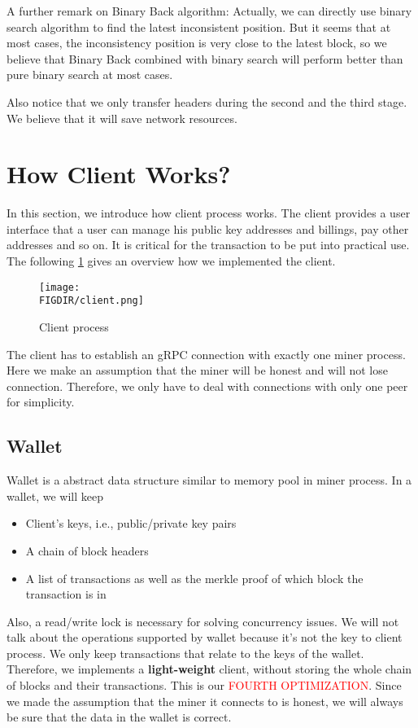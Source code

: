\documentclass{article}
\begin{document}
\begin{spacing}{1.1}
A further remark on Binary Back algorithm: Actually, we can directly use binary search algorithm to find the latest inconsistent position. But it seems that at most cases, the inconsistency position is very close to the latest block, so we believe that Binary Back combined with binary search will perform better than pure binary search at most cases. 

Also notice that we only transfer headers during the second and the third stage. We believe that it will save network resources.

\section{How Client Works?}

In this section, we introduce how client process works. The client provides a user interface that a user can manage his public key addresses and billings, pay other addresses and so on. It is critical for the transaction to be put into practical use. The following \cref{fig:client} gives an overview how we implemented the client.

\begin{figure}[htbp]
    \centering
    \texttt{[image: \\FIGDIR/client.png]}
    \caption{Client process}
    \label{fig:client}
\end{figure}

The client has to establish an gRPC connection with exactly one miner process. Here we make an assumption that the miner will be honest and will not lose connection. Therefore, we only have to deal with connections with only one peer for simplicity.

\subsection{Wallet}

Wallet is a abstract data structure similar to memory pool in miner process. In a wallet, we will keep 
\begin{itemize}
    \setlength\itemsep{1pt}
    \item Client's keys, i.e., public/private key pairs
    \item A chain of block headers
    \item A list of transactions as well as the merkle proof of which block the transaction is in
\end{itemize}

Also, a read/write lock is necessary for solving concurrency issues. We will not talk about the operations supported by wallet because it's not the key to client process. We only keep transactions that relate to the keys of the wallet. Therefore, we implements a \textbf{light-weight} client, without storing the whole chain of blocks and their transactions. This is our \textcolor{red}{FOURTH OPTIMIZATION}. Since we made the assumption that the miner it connects to is honest, we will always be sure that the data in the wallet is correct.


\end{spacing}
\end{document}
